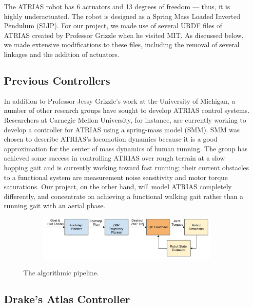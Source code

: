 \documentclass[letterpaper, 10 pt, conference]{ieeeconf}  %
\begin{document}
The ATRIAS robot has 6 actuators and 13 degrees of freedom --- thus, it is highly underactuated. The robot is designed as a Spring Mass Loaded Inverted Pendulum (SLIP).
For our project, we made use of several URDF files of ATRIAS created by Professor Grizzle when he visited MIT. As discussed below, we made extensive modifications to these files, including the removal of several linkages and the addition of actuators.

\subsection{Previous Controllers}

In addition to Professor Jessy Grizzle's work at the University of Michigan, a number of other research groups have sought to develop ATRIAS control systems. Researchers at Carnegie Mellon University, for instance, are currently working to develop a controller for ATRIAS using a spring-mass model (SMM). SMM was chosen to describe ATRIAS's locomotion dynamics because it is a good approximation for the center of mass dynamics of human running. \cite{hereid14} The group has achieved some success in controlling ATRIAS over rough terrain at a slow hopping gait and is currently working toward fast running; their current obstacles to a functional system are measurement noise sensitivity and motor torque saturations. Our project, on the other hand, will model ATRIAS completely differently, and concentrate on achieving a functional walking gait rather than a running gait with an aerial phase.

  \begin{figure}[tbp]
  \centering
  \begin{subfigure}[b]{0.7\textwidth}
    \centering
    \includegraphics[width=\textwidth] {figures/6_832blockdiagramsmall.jpg}
    \label{fig:pipeline1}
  \end{subfigure}\hfill
  \caption{The algorithmic pipeline.}
  \label{fig:pipeline}
\end{figure}

\subsection{Drake's Atlas Controller}
\end{document}
